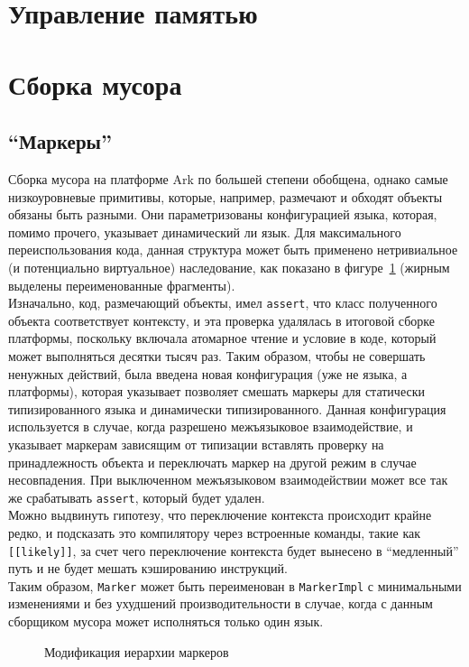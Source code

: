 \documentclass[times,specification,annotation]{itmo-student-thesis}
\begin{document}
\section{Управление памятью}

\section{Сборка мусора}
\subsection{``Маркеры''}
Сборка мусора на платформе Ark по большей степени обобщена, однако самые низкоуровневые примитивы, которые, например, размечают и обходят объекты обязаны быть разными. Они параметризованы конфигурацией языка, которая, помимо прочего, указывает динамический ли язык. Для максимального переиспользования кода, данная структура может быть применено нетривиальное (и потенциально виртуальное) наследование, как показано в фигуре~\ref{fig:gc-markers} (жирным выделены переименованные фрагменты).\\
Изначально, код, размечающий объекты, имел \texttt{assert}, что класс полученного объекта соответствует контексту, и эта проверка удалялась в итоговой сборке платформы, поскольку включала атомарное чтение и условие в коде, который может выполняться десятки тысяч раз. Таким образом, чтобы не совершать ненужных действий, была введена новая конфигурация (уже не языка, а платформы), которая указывает позволяет смешать маркеры для статически типизированного языка и динамически типизированного. Данная конфигурация используется в случае, когда разрешено межъязыковое взаимодействие, и указывает маркерам зависящим от типизации вставлять проверку на принадлежность объекта и переключать маркер на другой режим в случае несовпадения. При выключенном межъязыковом взаимодействии может все так же срабатывать \texttt{assert}, который будет удален.\\
Можно выдвинуть гипотезу, что переключение контекста происходит крайне редко, и подсказать это компилятору через встроенные команды, такие как \texttt{[[likely]]}, за счет чего переключение контекста будет вынесено в ``медленный'' путь и не будет мешать кэшированию инструкций.\\
Таким образом, \texttt{Marker} может быть переименован в \texttt{MarkerImpl} с минимальными изменениями и без ухудшений производительности в случае, когда с данным сборщиком мусора может исполняться только один язык.
\begin{figure}[H]
\caption{Модификация иерархии маркеров}\label{fig:gc-markers}
\centering
\end{figure}
\end{document}
